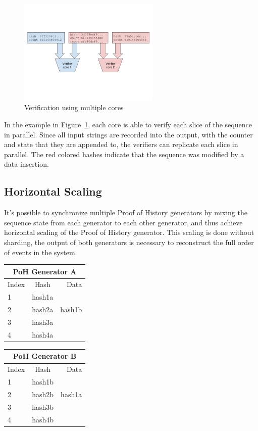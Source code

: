 \documentclass[12pt]{article}
\begin{document}
\begin{figure}
  \begin{center}
    \centering
    \includegraphics[width=0.6\textwidth]{figures/fig_4.png}
    \caption[Figure 4]{Verification using multiple cores\label{fig:poh_verify}}
  \end{center}
  \end{figure}

In the example in Figure~\ref{fig:poh_verify}, each core is able to verify each slice of the sequence in parallel. Since all input strings are recorded into the output, with the counter and state that they are appended to, the verifiers can replicate each slice in parallel.  The red colored hashes indicate that the sequence was modified by a data insertion.

\subsection{Horizontal Scaling}\label{poh:scale}
It's possible to synchronize multiple Proof of History generators by mixing the sequence state from each generator to each other generator, and thus achieve horizontal scaling of the Proof of History generator.  This scaling is done without sharding, the output of both generators is necessary to reconstruct the full order of events in the system.

\begin{center}
  \begin{tabular}{ | l | c | r |}
    \hline
    \multicolumn{3}{|c|}{PoH Generator A} \\
    \hline
    Index & Hash & Data \\ \hline
    1 & hash1a & \\ \hline
    2 & hash2a & hash1b \\ \hline
    3 & hash3a & \\ \hline
    4 & hash4a & \\
    \hline
    \end{tabular}
  \begin{tabular}{ | l | c | r |}
    \hline
    \multicolumn{3}{|c|}{PoH Generator B} \\
    \hline
    Index & Hash & Data \\ \hline
    1 & hash1b & \\ \hline
    2 & hash2b & hash1a \\ \hline
    3 & hash3b & \\ \hline
    4 & hash4b & \\
    \hline
    \end{tabular}
\end{center}
\end{document}
